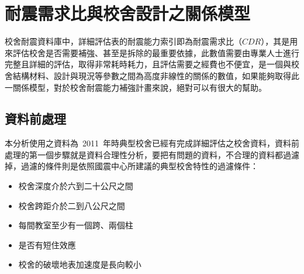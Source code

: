 \section{耐震需求比與校舍設計之關係模型}

校舍耐震資料庫中，詳細評估表的耐震能力索引即為耐震需求比（$CDR$），其是用來評估校舍是否需要補強、甚至是拆除的最重要依據，此數值需要由專業人士進行完整且詳細的評估，取得非常耗時耗力，且評估需要之經費也不便宜，是一個與校舍結構材料、設計與現況等參數之間為高度非線性的關係的數值，如果能夠取得此一關係模型，對於校舍耐震能力補強計畫來說，絕對可以有很大的幫助。

\subsection{資料前處理}

本分析使用之資料為~2011~年時典型校舍已經有完成詳細評估之校舍資料，資料前處理的第一個步驟就是資料合理性分析，要把有問題的資料，不合理的資料都過濾掉，過濾的條件則是依照國震中心所建議的典型校舍特性的過濾條件：


\begin{itemize}
\item 校舍深度介於六到二十公尺之間
\item 校舍跨距介於二到八公尺之間
\item 每間教室至少有一個跨、兩個柱
\item 是否有短住效應 %
\item 校舍的破壞地表加速度是長向較小
\end{itemize}

